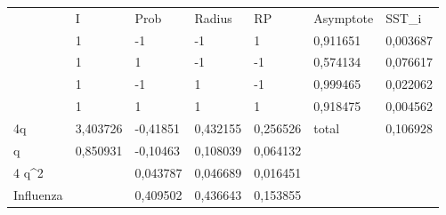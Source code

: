 \begin{table}[H]
\centering
\begin{tabular}{l|l|l|l|l|ll}
\cline{2-7}
 & I & Prob & Radius & RP & \multicolumn{1}{l|}{Asymptote} & \multicolumn{1}{l|}{SST\_i} \\ \cline{2-7} 
 & 1 & -1 & -1 & 1 & \multicolumn{1}{l|}{0,911651} & \multicolumn{1}{l|}{0,003687} \\ \cline{2-7} 
 & 1 & 1 & -1 & -1 & \multicolumn{1}{l|}{0,574134} & \multicolumn{1}{l|}{0,076617} \\ \cline{2-7} 
 & 1 & -1 & 1 & -1 & \multicolumn{1}{l|}{0,999465} & \multicolumn{1}{l|}{0,022062} \\ \cline{2-7} 
 & 1 & 1 & 1 & 1 & \multicolumn{1}{l|}{0,918475} & \multicolumn{1}{l|}{0,004562} \\ \hline
\multicolumn{1}{|l|}{4q} & 3,403726 & -0,41851 & 0,432155 & 0,256526 & \multicolumn{1}{l|}{total} & \multicolumn{1}{l|}{0,106928} \\ \hline
\multicolumn{1}{|l|}{q} & 0,850931 & -0,10463 & 0,108039 & 0,064132 &  &  \\ \cline{1-5}
\multicolumn{1}{|l|}{4 q\textasciicircum{}2} &  & 0,043787 & 0,046689 & 0,016451 &  &  \\ \cline{1-5}
\multicolumn{1}{|l|}{Influenza} &  & 0,409502 & 0,436643 & 0,153855 &  &  \\ \cline{1-5}
\end{tabular}
\end{table}